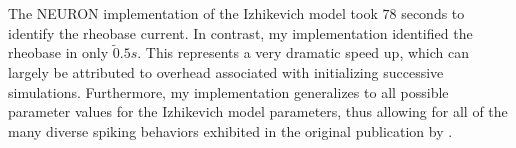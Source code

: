 
        
The NEURON implementation of the Izhikevich model took $78$ seconds to identify the rheobase current.
In contrast, my implementation identified the rheobase in only $\tilde 0.5 s$.
This represents a very dramatic speed up, which can largely be attributed to overhead associated with initializing successive simulations.
Furthermore, my implementation generalizes to all possible parameter values for the Izhikevich model parameters, thus allowing for all of the many diverse spiking behaviors exhibited in the original publication by \cite{izhikevich2003simple}.

        


